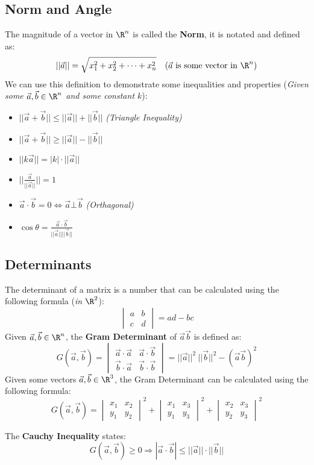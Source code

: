 \documentclass[a4paper]{article}
\begin{document}
  \subsection{Norm and Angle}\label{norm}
  The magnitude of a vector in $\R^n$ is called the \textbf{Norm}, it is notated and defined as:
  \[
    ||\vec{a}|| = \sqrt{x_1^2 + x_2^2 + \dots + x_n^2} \quad (\vec{a}\textrm{ is some vector in }\R^n)
  \]
  We can use this definition to demonstrate some inequalities and properties (\textit{Given some $\vec{a},\vec{b} \in \R^n$ and some constant $k$}):
  \begin{itemize}
    \item $|| \vec{a} + \vec{b} ||  \le ||\vec{a}|| + ||\vec{b}||$ \textit{(Triangle Inequality)}
    \item $|| \vec{a} + \vec{b} || \geq ||\vec{a}|| - ||\vec{b}||$
    \item $|| k \vec{a} || = |k| \cdot || \vec{a}||$
    \item $|| \displaystyle\frac{\vec{a}}{||\vec{a}||}|| = 1$
    \item $\vec{a} \cdot \vec{b} = 0 \Leftrightarrow \vec{a} \bot \vec{b}$ \textit{(Orthagonal)}
    \item $\cos \theta = \displaystyle\frac{\vec{a}\cdot\vec{b}}{||\vec{a}||  ||\vec{b}||}$
  \end{itemize}
  \subsection{Determinants}
  The determinant of a matrix is a number that can be calculated using the following formula (\textit{in $\R^2$}):
  \[
    \begin{vmatrix}
      a & b \\ c & d
    \end{vmatrix}
    = ad - bc
  \]
  Given $\vec{a},\vec{b} \in \R^n$, the \textbf{Gram Determinant} of $\vec{a}\vec{b}$ is defined as:
  \[
    G(\vec{a},\vec{b})
    = \begin{vmatrix}
      \vec{a} \cdot \vec{a} & \vec{a} \cdot \vec{b} \\
      \vec{b} \cdot \vec{a} & \vec{b} \cdot \vec{b}
    \end{vmatrix}
    = ||\vec{a}||^2 \ ||\vec{b}||^2 - (\vec{a}\vec{b})^2
  \]
  Given some vectors $\vec{a},\vec{b} \in \R^3$, the Gram Determinant can be calculated using the following formula:
  \[
    G(\vec{a},\vec{b}) = \begin{vmatrix}
      x_1 & x_2 \\ y_1 & y_2 
    \end{vmatrix}^2 +
    \begin{vmatrix}
      x_1 & x_3 \\ y_1 & y_3
    \end{vmatrix}^2 +
    \begin{vmatrix}
      x_2 & x_3 \\ y_2 & y_3
    \end{vmatrix}^2
  \]
  \begin{lemma}
    The \textbf{Cauchy Inequality} states:
    \[
      G (\vec{a},\vec{b}) \geq 0 \Rightarrow |\vec{a} \cdot \vec{b}| \le || \vec{a}|| \cdot || \vec{b} ||
    \]
  \end{lemma}
\end{document}
